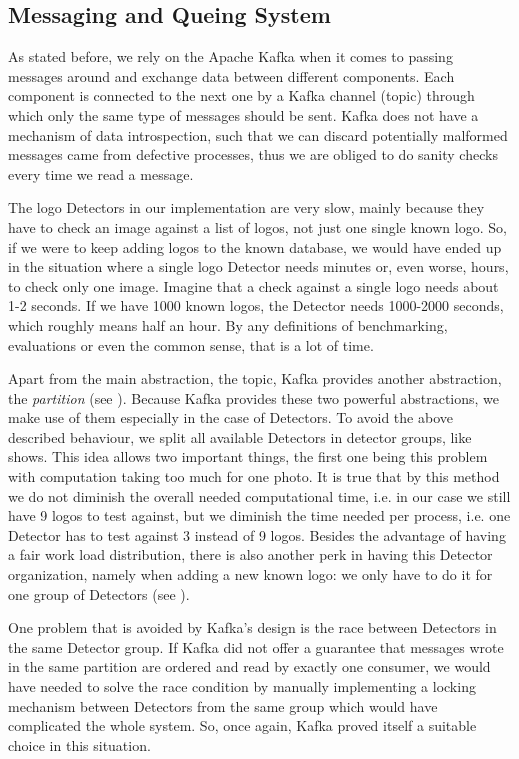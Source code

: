 \subsection{Messaging and Queing System}
\label{sub-sec:q-system}

As stated before, we rely on the Apache Kafka when it comes to passing
messages around and exchange data between different components. Each component
is connected to the next one by a Kafka channel (topic) through which only the
same type of messages should be sent. Kafka does not have a mechanism of data
introspection, such that we can discard potentially malformed messages came from
defective processes, thus we are obliged to do sanity checks every time we
read a message.

The logo Detectors in our implementation are very slow,
mainly because they have to check an image against a list of logos, not just
one single known logo. So, if we were to keep adding logos to the known
database, we would have ended up in the situation where a single logo Detector
needs minutes or, even worse, hours, to check only one image. Imagine that a
check against a single logo needs about
1-2 seconds. If we have 1000 known logos, the Detector needs 1000-2000
seconds,  which roughly means half an hour. By any definitions of
benchmarking, evaluations or even the common sense, that is a lot of
time.

Apart from the main abstraction, the topic, Kafka provides another abstraction, the
\textit{partition} (see ). Because Kafka
provides these two powerful abstractions, we make use of them especially in
the case of Detectors. To avoid the above described behaviour, we split all
available Detectors in detector groups, like
 shows. This idea allows two
important things, the first one being this problem with computation taking too
much for one photo. It is true that by this method we do not diminish the
overall needed computational time, i.e. in our case we still have 9 logos to
test against, but we diminish the time needed per process, i.e. one Detector
has to test against 3 instead of 9 logos. Besides the advantage of having a
fair work load distribution, there is also another perk in having this
Detector organization, namely when adding a new known logo: we only have to do
it for one group of Detectors (see ).

One problem that is avoided by Kafka's design is the race between Detectors in
the same Detector group. If Kafka did not offer a guarantee that messages
wrote in the same partition are ordered and read by exactly one consumer, we
would have needed to solve the race condition by manually implementing a locking
mechanism between Detectors from the same group which would have complicated
the whole system. So, once again, Kafka proved itself a suitable choice in
this situation.

